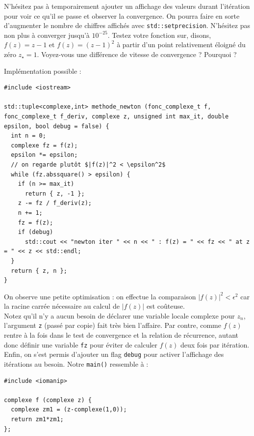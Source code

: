 \documentclass{book}
\newcommand{\inline}[1]{\texttt{#1}}
\begin{document}
\vspace{1em}
N'hésitez pas à temporairement ajouter un affichage des valeurs durant l'itération pour voir ce qu'il se passe et observer la convergence. On pourra faire en sorte d'augmenter le nombre de chiffres affichés avec \inline{std::setprecision}. N'hésitez pas non plus à converger jusqu'à $10^{-25}$. Testez votre fonction sur, disons, $f(z)=z-1$ et $f(z)=(z-1)^2$ à partir d'un point relativement éloigné du zéro $z_\star=1$. Voyez-vous une différence de vitesse de convergence ? Pourquoi ?\\

\begin{correction}
Implémentation possible :

\begin{verbatim}
#include <iostream>

std::tuple<complexe,int> methode_newton (fonc_complexe_t f, fonc_complexe_t f_deriv, complexe z, unsigned int max_it, double epsilon, bool debug = false) {
  int n = 0;
  complexe fz = f(z);
  epsilon *= epsilon;
  // on regarde plutôt $|f(z)|^2 < \epsilon^2$
  while (fz.abssquare() > epsilon) {
    if (n >= max_it)
      return { z, -1 };
    z -= fz / f_deriv(z);
    n += 1;
    fz = f(z);
    if (debug)
      std::cout << "newton iter " << n << " : f(z) = " << fz << " at z = " << z << std::endl;
  }
  return { z, n };
}
\end{verbatim}

On observe une petite optimisation : on effectue la comparaison $|f(z)|^2 < \epsilon^2$ car la racine carrée nécessaire au calcul de $|f(z)|$ est coûteuse.\\

Notez qu'il n'y a aucun besoin de déclarer une variable locale complexe pour $z_n$, l'argument \inline{z} (passé par copie) fait très bien l'affaire. Par contre, comme $f(z)$ rentre à la fois dans le test de convergence et la relation de récurrence, autant donc définir une variable \inline{fz} pour éviter de calculer $f(z)$ deux fois par itération.\\

Enfin, on s'est permis d'ajouter un flag \inline{debug} pour activer l'affichage des itérations au besoin. Notre \inline{main()} ressemble à :

\begin{verbatim}
#include <iomanip>

complexe f (complexe z) {
  complexe zm1 = (z-complexe(1,0));
  return zm1*zm1;
};


\end{verbatim}
\end{correction}
\end{document}
